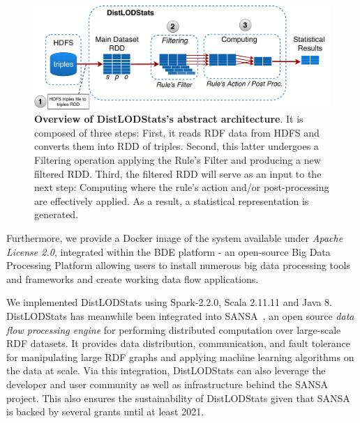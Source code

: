 \begin{figure}
\centering
\includegraphics[width=1.0\textwidth]{images/4_distlodstats/distlodstats-system.pdf}
\caption{\textbf{Overview of DistLODStats's abstract architecture}. It is composed of three steps: First, it reads RDF data from HDFS and converts them into RDD of triples. Second, this latter undergoes a Filtering operation applying the Rule's Filter and producing a new filtered RDD. Third, the filtered RDD will serve as an input to the next step: Computing where the rule's action and/or post-processing are effectively applied. As a result, a statistical representation is generated.}
\label{fig:DistLODStatsSystem}
\end{figure}
Furthermore, we provide a Docker image of the system available under \textit{Apache License 2.0}, integrated within the BDE platform - an open-source Big Data Processing Platform allowing users to install numerous big data processing tools and frameworks and create working data flow applications.

We implemented DistLODStats using Spark-2.2.0, Scala 2.11.11 and Java 8. 
DistLODStats has meanwhile been integrated into SANSA~\cite{lehmann-2017-sansa-iswc,iermilov-2017-sansa-iswc-demo}, an open source \emph{data flow processing engine} for performing distributed computation over large-scale \gls{RDF} datasets. 
It provides data distribution, communication, and fault tolerance for manipulating large \gls{RDF} graphs and applying machine learning algorithms on the data at scale. 
Via this integration, DistLODStats can also leverage the developer and user community as well as infrastructure behind the SANSA project. 
This also ensures the sustainability of DistLODStats given that SANSA is backed by several grants until at least 2021.


